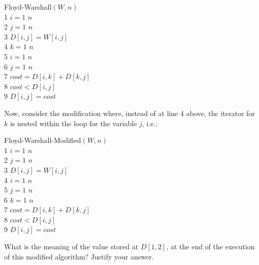 \begin{code}
	{\sc Floyd-Warshall}$(W,n)$\\
	1 \> \For $i=1$ \To $n$\\
	2 \> \> \For $j=1$ \To $n$\\
	3 \> \> \> $D[i,j]=W[i,j]$\\
	4 \> \For $k=1$ \To $n$\\
	5 \> \> \For $i=1$ \To $n$\\
	6 \> \> \> \For $j=1$ \To $n$\\
	7 \> \> \> \> $cost=D[i,k]+D[k,j]$\\
	8 \> \> \> \> \If $cost<D[i,j]$ \\
	9 \> \> \> \> \> $D[i,j]=cost$\\
\end{code}
Now, consider the modification where, instead of at line 4 above, the iterator for $k$ is nested within the loop for the variable $j$, i.e.:
\begin{code}
	{\sc Floyd-Warshall-Modified}$(W,n)$\\
	1 \> \For $i=1$ \To $n$\\
	2 \> \> \For $j=1$ \To $n$\\
	3 \> \> \> $D[i,j]=W[i,j]$\\
	4 \> \For $i=1$ \To $n$\\
	5 \> \> \For $j=1$ \To $n$\\
	6 \> \> \> \For $k=1$ \To $n$\\
	7 \> \> \> \> $cost=D[i,k]+D[k,j]$\\
	8 \> \> \> \> \If $cost<D[i,j]$ \\
	9 \> \> \> \> \> $D[i,j]=cost$\\
\end{code}
What is the meaning of the value stored at $D[1,2]$, at the end of the execution of this modified algorithm? Justify your answer. 
\begin{solution}

\end{solution}
